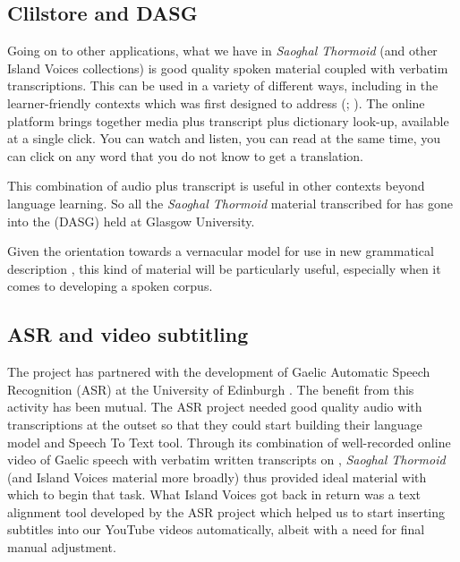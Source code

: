 \documentclass[output=paper,colorlinks,citecolor=brown]{langscibook}
\begin{document}
\subsection{Clilstore and DASG}\label{sec:wells:clilstoreDASG}

Going on to other applications, what we have in \textit{Saoghal Thormoid} (and other Island Voices collections) is good quality spoken material coupled with verbatim transcriptions. This can be used in a variety of different ways, including in the learner-friendly contexts which  was first designed to address (\citealt{gw:ÓDónaill2013, gw:ÓDónaill2022}; \citealt{gw:ÓDonnaíle2014}). The online platform brings together media plus transcript plus dictionary look-up, available at a single click. You can watch and listen, you can read at the same time, you can click on any word that you do not know to get a translation.

This combination of audio plus transcript is useful in other contexts beyond language learning. So all the \textit{Saoghal Thormoid} material transcribed for  has gone into the  (DASG) held at Glasgow University. 

Given the orientation towards a vernacular model for use in new grammatical description \citep{gw:ÓMaolalaigh2014}, this kind of material will be particularly useful, especially when it comes to developing a spoken corpus.


\subsection{ASR and video subtitling}

The project has partnered with the development of Gaelic Automatic Speech Recognition (ASR) at the University of Edinburgh \citep{gw:Evans2022}. The benefit from this activity has been mutual. The ASR project needed good quality audio with transcriptions at the outset so that they could start building their language model and Speech To Text tool. Through its combination of well-recorded online video of Gaelic speech with verbatim written transcripts on , \textit{Saoghal Thormoid} (and Island Voices material more broadly) thus provided ideal material with which to begin that task. What Island Voices got back in return was a text alignment tool developed by the ASR project which helped us to start inserting subtitles into our YouTube videos automatically, albeit with a need for final manual adjustment.
\end{document}
